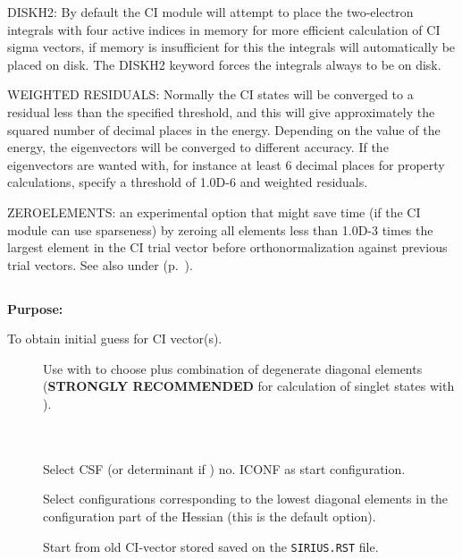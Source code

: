 
DISKH2: By default the CI module will attempt to place the two-electron
integrals with four active indices in memory for more efficient
calculation of CI sigma vectors, if memory is insufficient for this
the
integrals will automatically be placed on disk.  The DISKH2 keyword
forces the integrals always to be on disk.

WEIGHTED RESIDUALS:  Normally the CI states will be converged to a
residual less than the specified threshold, and this will give
approximately the squared number of decimal places in the energy.
Depending on the value of the energy, the eigenvectors will be converged
to different accuracy. If the eigenvectors are wanted with, for instance at
least 6 decimal places for property calculations, specify a threshold of
1.0D-6 and weighted residuals.

ZEROELEMENTS: an experimental option that might save time (if the CI
module can use sparseness) by zeroing all elements less than 1.0D-3
times the largest element in the CI trial vector before
orthonormalization against previous trial vectors.
See also  under 
(p.~\pageref{ref-optinp}).


\pagebreak[3]
\subsection{\label{ref-civinp}}

{\bf Purpose:}

To obtain initial guess for CI vector(s).

\begin{description}
\item[]
  Use with  to choose plus combination
  of degenerate   diagonal elements ({\bf STRONGLY RECOMMENDED} for
  calculation of singlet states  with ).

\item[] \ \\
   \\
  Select CSF (or determinant if ) no.
  ICONF as start configuration.

\item[]
  Select configurations corresponding to the lowest diagonal elements in
  the configuration part of the Hessian (this is the default option).

\item[]
  Start from old CI-vector stored saved on the \verb|SIRIUS.RST| file.


\end{description}

